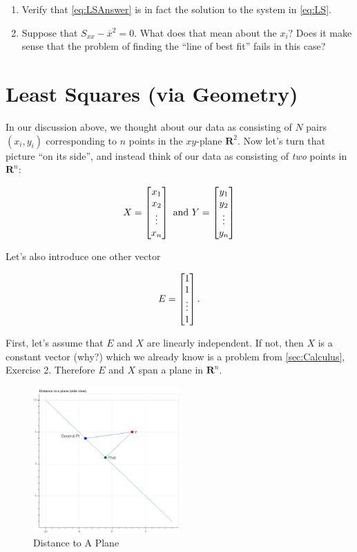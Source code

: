 \documentclass[
  oneside]{scrbook}
\begin{document}
\begin{enumerate}
\def\labelenumi{\arabic{enumi}.}
\item
  Verify that \cref{eq:LSAnswer} is in fact the solution to the system
  in \cref{eq:LS}.
\item
  Suppose that \(S_{xx}-\overline{x}^2=0\). What does that mean about
  the \(x_i\)? Does it make sense that the problem of finding the ``line
  of best fit'' fails in this case?
\end{enumerate}

\hypertarget{sec:LinAlg}{%
\section{Least Squares (via Geometry)}\label{sec:LinAlg}}

In our discussion above, we thought about our data as consisting of
\(N\) pairs \((x_i,y_i)\) corresponding to \(n\) points in the
\(xy\)-plane \(\mathbf{R}^2\). Now let's turn that picture ``on its
side'', and instead think of our data as consisting of \emph{two} points
in \(\mathbf{R}^{n}\):

\[ X=\left[\begin{matrix} x_1\cr x_2\cr \vdots\cr
x_n\end{matrix}\right] \mathrm{\ and\ } Y = \left[\begin{matrix}
y_1\cr y_2\cr \vdots\cr y_n\end{matrix}\right] \]

Let's also introduce one other vector

\[ E = \left[\begin{matrix} 1 \cr 1 \cr \vdots \cr
1\end{matrix}\right].  \]

First, let's assume that \(E\) and \(X\) are linearly independent. If
not, then \(X\) is a constant vector (why?) which we already know is a
problem from \cref{sec:Calculus}, Exercise 2. Therefore \(E\) and \(X\)
span a plane in \(\mathbf{R}^{n}\).

\begin{figure}
\hypertarget{fig:perp}{%
\centering
\includegraphics[width=0.5\textwidth,height=\textheight]{img/distance-to-plane.png}
\caption{Distance to A Plane}\label{fig:perp}
}
\end{figure}
\end{document}
